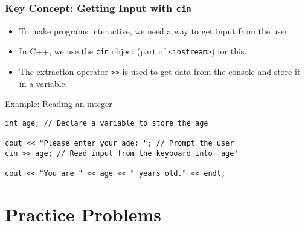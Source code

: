 \documentclass{beamer}
\begin{document}
\begin{frame}
\frametitle{Key Concept: Getting Input with \texttt{cin}}
\begin{itemize}
    \item To make programs interactive, we need a way to get input from the user.
    \item In C++, we use the \texttt{cin} object (part of \texttt{<iostream>}) for this.
    \item The extraction operator \texttt{>>} is used to get data from the console and store it in a variable.
\end{itemize}
\pause
\begin{block}{Example: Reading an integer}
\begin{verbatim}
int age; // Declare a variable to store the age

cout << "Please enter your age: "; // Prompt the user
cin >> age; // Read input from the keyboard into 'age'

cout << "You are " << age << " years old." << endl;
\end{verbatim}
\end{block}
\end{frame}

\section{Practice Problems}
\end{document}
